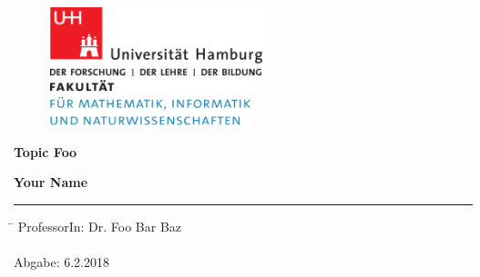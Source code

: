 \begin{titlepage}

    \setcounter{page}{-1}

        \begin{figure}[h]
            \begin{minipage}[b]{62mm}
                \includegraphics[width=62mm]{images/unilogo}
            \end{minipage}
                \hspace{4cm}
                \begin{minipage}[b]{59mm}
                    \includegraphics[width=59mm]{images/minlogo}
                \end{minipage}
        \end{figure}

        \vfill

        \begin{center}
                \vspace{14mm}
                \noindent \textbf{\huge
                  Topic Foo
                }
                \vspace{60mm}
        \end{center}

        \vfill
        \noindent \textbf{Your Name} \\
        \noindent \rule{\textwidth}{0.4mm}

        \begin{tabbing}
            \hspace{8em} \=  \kill
            ProfessorIn: \> Dr. Foo Bar Baz \\
            ~\\
            Abgabe: 6.2.2018
        \end{tabbing}

        \thispagestyle{empty}
        \setcounter{page}{0}

\end{titlepage}

